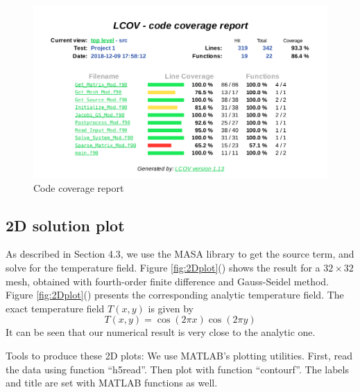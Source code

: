 \documentclass{article}
\begin{document}
\begin{figure}
    \centering
    \includegraphics[width=\textwidth]{code_coverage.png}
    \caption{Code coverage report}
    \label{fig:code_coverage}
\end{figure}

\subsection{2D solution plot}
As described in Section 4.3, we use the MASA library to get the source term, and solve for the temperature 
field. Figure \ref{fig:2Dplot}() shows the result for a $32 \times 32$ mesh,
obtained with fourth-order finite difference and Gauss-Seidel method. Figure 
\ref{fig:2Dplot}() presents the corresponding analytic temperature field. The
exact temperature field $T(x,y)$ is given by
$$T(x,y) = \cos(2\pi x) \cos(2\pi y)$$
It can be seen that our numerical result is very close to the analytic one.

Tools to produce these 2D plots: We use MATLAB's plotting utilities. First, read the data using function
``h5read''. Then plot with function ``contourf''. The labels and title are set with MATLAB functions as
well.
\end{document}
